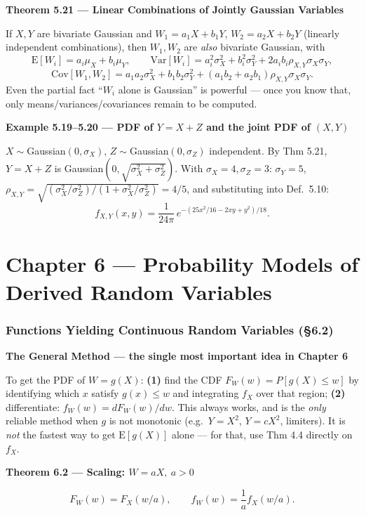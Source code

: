 \documentclass[11pt]{article}
\newcommand{\E}[1]{\mathrm{E}\left[#1\right]}
\newcommand{\Var}[1]{\mathrm{Var}\left[#1\right]}
\newcommand{\Cov}[1]{\mathrm{Cov}\left[#1\right]}
\renewcommand{\P}[1]{P\left[#1\right]}
\newcommand{\topline}[1]{\par\vspace{5pt}\noindent{\color{#1}\rule{\linewidth}{1.1pt}}\par\vspace{3pt}}
\newcommand{\botline}[1]{\par\vspace{2pt}\noindent{\color{#1}\rule{\linewidth}{1.1pt}}\par\vspace{8pt}}
\newenvironment{thmbox}[2]{%
  \topline{thmcol}\noindent\textbf{\color{thmcol}Theorem #1 --- #2}\par\smallskip\noindent\ignorespaces
}{\botline{thmcol}}
\newenvironment{exbox}[2]{%
  \topline{exmcol}\noindent\textbf{\color{exmcol}Example #1 --- #2}\par\smallskip\noindent\ignorespaces
}{\botline{exmcol}}
\newenvironment{notebox}[1]{%
  \topline{notecol}\noindent\textbf{\color{notecol}#1}\par\smallskip\noindent\ignorespaces
}{\botline{notecol}}
\begin{document}
\begin{thmbox}{5.21}{Linear Combinations of Jointly Gaussian Variables}
If $X,Y$ are bivariate Gaussian and $W_1=a_1X+b_1Y$, $W_2=a_2X+b_2Y$ (linearly independent
combinations), then $W_1,W_2$ are \emph{also} bivariate Gaussian, with
\[
\E{W_i}=a_i\mu_X+b_i\mu_Y,\qquad
\Var{W_i}=a_i^2\sigma_X^2+b_i^2\sigma_Y^2+2a_ib_i\rho_{X,Y}\sigma_X\sigma_Y,
\]
\[
\Cov{W_1,W_2} = a_1a_2\sigma_X^2+b_1b_2\sigma_Y^2+(a_1b_2+a_2b_1)\rho_{X,Y}\sigma_X\sigma_Y.
\]
Even the partial fact ``$W_i$ alone is Gaussian'' is powerful --- once you know that, only
means/variances/covariances remain to be computed.
\end{thmbox}

\begin{exbox}{5.19--5.20}{PDF of $Y=X+Z$ and the joint PDF of $(X,Y)$}
$X\sim$Gaussian$(0,\sigma_X)$, $Z\sim$Gaussian$(0,\sigma_Z)$ independent. By Thm 5.21, $Y=X+Z$
is Gaussian$(0,\sqrt{\sigma_X^2+\sigma_Z^2})$. With $\sigma_X=4,\sigma_Z=3$: $\sigma_Y=5$,
$\rho_{X,Y}=\sqrt{(\sigma_X^2/\sigma_Z^2)/(1+\sigma_X^2/\sigma_Z^2)}=4/5$, and substituting
into Def.\ 5.10:
\[ f_{X,Y}(x,y) = \frac{1}{24\pi}\,e^{-(25x^2/16-2xy+y^2)/18}. \]
\end{exbox}

\clearpage
\part{Chapter 6 --- Probability Models of Derived Random Variables}
\section{Functions Yielding Continuous Random Variables (\S6.2)}
\label{sec:62}

\begin{notebox}{The General Method --- the single most important idea in Chapter 6}
To get the PDF of $W=g(X)$: \textbf{(1)} find the CDF $F_W(w)=\P{g(X)\le w}$ by identifying
which $x$ satisfy $g(x)\le w$ and integrating $f_X$ over that region; \textbf{(2)}
differentiate: $f_W(w)=dF_W(w)/dw$. This always works, and is the \emph{only} reliable method
when $g$ is not monotonic (e.g.\ $Y=X^2$, $Y=cX^2$, limiters). It is \emph{not} the fastest way
to get $\E{g(X)}$ alone --- for that, use Thm 4.4 directly on $f_X$.
\end{notebox}

\begin{thmbox}{6.2}{Scaling: $W=aX,\ a>0$}
\[ F_W(w) = F_X(w/a), \qquad f_W(w) = \frac{1}{a}f_X(w/a). \]
\end{thmbox}
\end{document}
